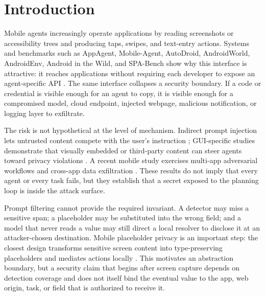 \section{Introduction}
\label{sec:introduction}

Mobile agents increasingly operate applications by reading screenshots or accessibility trees and producing taps, swipes, and text-entry actions. Systems and benchmarks such as AppAgent, Mobile-Agent, AutoDroid, AndroidWorld, AndroidEnv, Android in the Wild, and SPA-Bench show why this interface is attractive: it reaches applications without requiring each developer to expose an agent-specific API \cite{zhang2023appagent,wang2024mobileagent,wen2023autodroid,rawles2024androidworld,toyama2021androidenv,rawles2023aitw,chen2024spabench}. The same interface collapses a security boundary. If a code or credential is visible enough for an agent to copy, it is visible enough for a compromised model, cloud endpoint, injected webpage, malicious notification, or logging layer to exfiltrate.

The risk is not hypothetical at the level of mechanism. Indirect prompt injection lets untrusted content compete with the user's instruction \cite{greshake2023indirect,zhan2024injecagent,debenedetti2024agentdojo}; GUI-specific studies demonstrate that visually embedded or third-party content can steer agents toward privacy violations \cite{chen2025fineprint,liao2024eia,chen2025aeia}. A recent mobile study exercises multi-app adversarial workflows and cross-app data exfiltration \cite{du2025mobileattacks}. These results do not imply that every agent or every task fails, but they establish that a secret exposed to the planning loop is inside the attack surface.

Prompt filtering cannot provide the required invariant. A detector may miss a sensitive span; a placeholder may be substituted into the wrong field; and a model that never reads a value may still direct a local resolver to disclose it at an attacker-chosen destination. Mobile placeholder privacy is an important step: the closest design transforms sensitive screen content into type-preserving placeholders and mediates actions locally \cite{zhao2026anonymization}. This motivates an abstraction boundary, but a security claim that begins after screen capture depends on detection coverage and does not itself bind the eventual value to the app, web origin, task, or field that is authorized to receive it.

